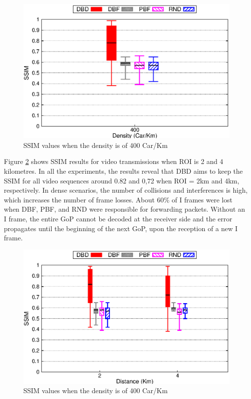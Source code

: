 \documentclass{acm_proc_article-sp}
\begin{document}
\begin{figure}[tb]
\begin{center}
\includegraphics[width=.9\columnwidth]{./fig/selected/barSSIMxDen.eps}
\caption{SSIM values when the density is of 400 Car/Km}
\label{fig:SSIM2}
\end{center}
\end{figure}


Figure \ref{fig:SSIM3} shows SSIM results for video transmissions when ROI is 2 and 4 kilometres. In all the experiments, the results reveal that DBD aims to keep the SSIM for all video sequences around 0.82 and 0,72 when ROI = 2km and 4km, respectively. In dense scenarios, the number of collisions and interferences is high, which increases the number of frame losses. About 60\% of I frames were lost when DBF, PBF, and RND were responsible for forwarding packets. Without an I frame, the entire GoP cannot be decoded at the receiver side and the error propagates until the beginning of the next GoP, upon the reception of a new I frame.


\begin{figure}[tb]
\begin{center}
\includegraphics[width=.9\columnwidth]{./fig/selected/barSSIMxKm.eps}
\caption{SSIM values when the density is of 400 Car/Km}
\label{fig:SSIM3}
\end{center}
\end{figure}
\end{document}
